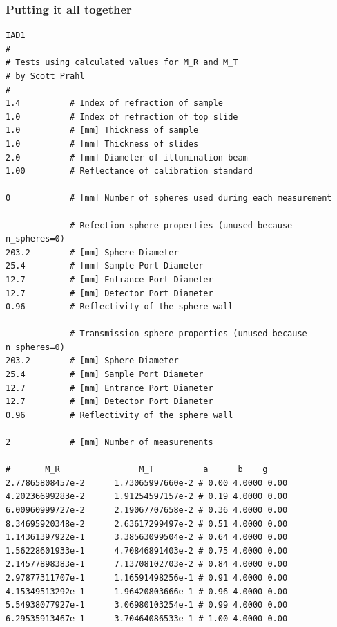 \documentclass{article}
\begin{document}
\subsubsection{Putting it all together}
\begin{table}
\begin{center}
\begin{minipage}{8cm}
\small
\begin{verbatim}
IAD1
#
# Tests using calculated values for M_R and M_T
# by Scott Prahl
#
1.4          # Index of refraction of sample
1.0          # Index of refraction of top slide
1.0          # [mm] Thickness of sample
1.0          # [mm] Thickness of slides
2.0          # [mm] Diameter of illumination beam
1.00         # Reflectance of calibration standard

0            # [mm] Number of spheres used during each measurement

             # Refection sphere properties (unused because n_spheres=0)
203.2        # [mm] Sphere Diameter
25.4         # [mm] Sample Port Diameter
12.7         # [mm] Entrance Port Diameter
12.7         # [mm] Detector Port Diameter
0.96         # Reflectivity of the sphere wall

             # Transmission sphere properties (unused because n_spheres=0)
203.2        # [mm] Sphere Diameter
25.4         # [mm] Sample Port Diameter
12.7         # [mm] Entrance Port Diameter
12.7         # [mm] Detector Port Diameter
0.96         # Reflectivity of the sphere wall

2            # [mm] Number of measurements

#       M_R     	       M_T        	a	   b    g
2.77865808457e-2	  1.73065997660e-2 # 0.00 4.0000 0.00
4.20236699283e-2	  1.91254597157e-2 # 0.19 4.0000 0.00
6.00960999727e-2	  2.19067707658e-2 # 0.36 4.0000 0.00
8.34695920348e-2	  2.63617299497e-2 # 0.51 4.0000 0.00
1.14361397922e-1	  3.38563099504e-2 # 0.64 4.0000 0.00
1.56228601933e-1	  4.70846891403e-2 # 0.75 4.0000 0.00
2.14577898383e-1	  7.13708102703e-2 # 0.84 4.0000 0.00
2.97877311707e-1	  1.16591498256e-1 # 0.91 4.0000 0.00
4.15349513292e-1	  1.96420803666e-1 # 0.96 4.0000 0.00
5.54938077927e-1	  3.06980103254e-1 # 0.99 4.0000 0.00
6.29535913467e-1	  3.70464086533e-1 # 1.00 4.0000 0.00

\end{verbatim}
\end{minipage}
\end{center}
\caption{One of the test files \texttt{basic4.rxt}.  This is a test file
with accurately calculated values for $M_R$ and $M_T$.  As a consequence
the number of spheres has been set to zero.  Other test files in the
\texttt{test} directory may be helpful starting templates for your data.}
\end{table}
\end{document}
